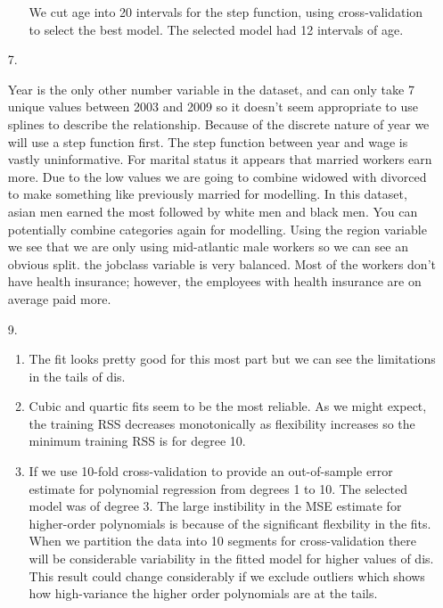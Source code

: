 \documentclass{article}
\begin{document}
\begin{enumerate}
\begin{enumerate}
        We cut age into 20 intervals for the step function, using cross-validation to select the best model. The selected model had 12 intervals of age. 
        
    \end{enumerate}
    
    \item [7. ]
    
    Year is the only other number variable in the dataset, and can only take 7 unique values between 2003 and 2009 so it doesn't seem appropriate to use splines to describe the relationship. Because of the discrete nature of year we will use a step function first. The step function between year and wage is vastly uninformative. For marital status it appears that married workers earn more. Due to the low values we are going to combine widowed with divorced to make something like previously married for modelling. In this dataset, asian men earned the most followed by white men and black men. You can potentially combine categories again for modelling. Using the region variable we see that we are only using mid-atlantic male workers so we can see an obvious split. the jobclass variable is very balanced. Most of the workers don't have health insurance; however, the employees with health insurance are on average paid more. 
    
    \item [9. ]
    
    \begin{enumerate}
        \item 
        
        The fit looks pretty good for this most part but we can see the limitations in the tails of dis.
        
        \item
        
        Cubic and quartic fits seem to be the most reliable. As we might expect, the training RSS decreases monotonically as flexibility increases so the minimum training RSS is for degree 10.
        
        \item
        
        If we use 10-fold cross-validation to provide an out-of-sample error estimate for polynomial regression from degrees 1 to 10. The selected model was of degree 3. The large instibility in the MSE estimate for higher-order polynomials is because of the significant flexbility in the fits. When we partition the data into 10 segments for cross-validation there will be considerable variability in the fitted model for higher values of dis. This result could change considerably if we exclude outliers which shows how high-variance the higher order polynomials are at the tails. 
        

\end{enumerate}
\end{enumerate}
\end{document}
